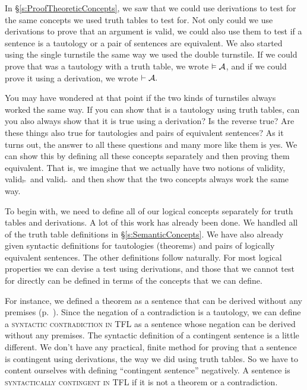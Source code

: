 In \S\ref{s:ProofTheoreticConcepts}, we saw that we could use derivations to test for the same concepts we used truth tables to test for. Not only could we use derivations to prove that an argument is valid, we could also use them to test if a sentence is a tautology or a pair of sentences are equivalent. We also started using the single turnstile the same way we used the double turnstile. If we could prove that  was a tautology with a truth table, we wrote $\vDash \mathcal{A}$, and if we could prove it using a derivation, we wrote $\vdash \mathcal{A}.$ 

You may have wondered at that point if the two kinds of turnstiles always worked the same way. If you can show that  is a tautology using truth tables, can you also always show that it is true using a derivation? Is the reverse true? Are these things also true for tautologies and pairs of equivalent sentences? As it turns out, the answer to all these questions and many more like them is yes. We can show this by defining all these concepts separately and then proving them equivalent. That is, we imagine that we actually have two notions of validity, valid$_{\vDash}$ and  valid$_{\vdash}$ and then show that the two concepts always work the same way. 

To begin with, we need to define all of our logical concepts separately for truth tables and derivations. A lot of this work has already been done. We handled all of the truth table definitions in \S\ref{s:SemanticConcepts}. We have also already given syntactic definitions for tautologies (theorems) and pairs of logically equivalent sentences. The other definitions follow naturally. For most logical properties we can devise a test using derivations, and those that we cannot test for directly can be defined in terms of the concepts that we can define.

For instance, we defined a theorem as a sentence that can be derived without any premises (p.~\pageref{def:syntactic_tautology_in_sl}). Since the negation of a contradiction is a tautology, we can define a \textsc{{syntactic contradiction in TFL}} \label{def:syntactic_contradiction_in_sl} as a sentence whose negation can be derived without any premises. The syntactic definition of a contingent sentence is a little different. We don't have any practical, finite method for proving that a sentence is contingent using derivations, the way we did using truth tables. So we have to content ourselves with defining ``contingent sentence'' negatively. A sentence is \textsc{{syntactically contingent in TFL}} \label{def:syntactically_contingent_in_sl} if it is not a theorem or a contradiction. 
 

